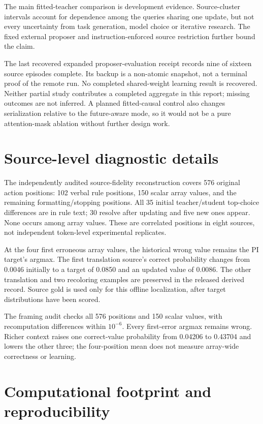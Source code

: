 \documentclass[11pt,letterpaper]{article}
\begin{document}
The main fitted-teacher comparison is development evidence. Source-cluster intervals account for dependence among the queries sharing one update, but not every uncertainty from task generation, model choice or iterative research. The fixed external proposer and instruction-enforced source restriction further bound the claim.

The last recovered expanded proposer-evaluation receipt records nine of sixteen source episodes complete. Its backup is a non-atomic snapshot, not a terminal proof of the remote run. No completed shared-weight learning result is recovered. Neither partial study contributes a completed aggregate in this report; missing outcomes are not inferred. A planned fitted-causal control also changes serialization relative to the future-aware mode, so it would not be a pure attention-mask ablation without further design work.

\section{Source-level diagnostic details}

The independently audited source-fidelity reconstruction covers 576 original action positions: 102 verbal rule positions, 150 scalar array values, and the remaining formatting/stopping positions. All 35 initial teacher/student top-choice differences are in rule text; 30 resolve after updating and five new ones appear. None occurs among array values. These are correlated positions in eight sources, not independent token-level experimental replicates.

At the four first erroneous array values, the historical wrong value remains the PI target's argmax. The first translation source's correct probability changes from 0.0046 initially to a target of 0.0850 and an updated value of 0.0086. The other translation and two recoloring examples are preserved in the released derived record. Source gold is used only for this offline localization, after target distributions have been scored.

The framing audit checks all 576 positions and 150 scalar values, with recomputation differences within $10^{-6}$. Every first-error argmax remains wrong. Richer context raises one correct-value probability from 0.04206 to 0.43704 and lowers the other three; the four-position mean does not measure array-wide correctness or learning.

\section{Computational footprint and reproducibility}
\end{document}
